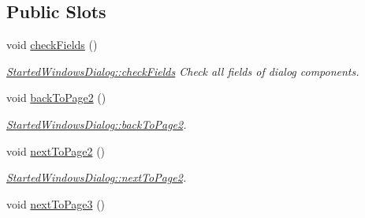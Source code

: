 \subsection*{Public Slots}
\begin{DoxyCompactItemize}
\item 
\hypertarget{classGui_1_1Dialogs_1_1StartedWindowsDialog_a9ea73c16c7917ff50c596cd1942dabfa}{void \hyperlink{classGui_1_1Dialogs_1_1StartedWindowsDialog_a9ea73c16c7917ff50c596cd1942dabfa}{check\-Fields} ()}\label{classGui_1_1Dialogs_1_1StartedWindowsDialog_a9ea73c16c7917ff50c596cd1942dabfa}

\begin{DoxyCompactList}\small\item\em \hyperlink{classGui_1_1Dialogs_1_1StartedWindowsDialog_a9ea73c16c7917ff50c596cd1942dabfa}{Started\-Windows\-Dialog\-::check\-Fields} Check all fields of dialog components. \end{DoxyCompactList}\item 
\hypertarget{classGui_1_1Dialogs_1_1StartedWindowsDialog_a690559be1b50a5ae7afc0ab64d0a28b8}{void \hyperlink{classGui_1_1Dialogs_1_1StartedWindowsDialog_a690559be1b50a5ae7afc0ab64d0a28b8}{back\-To\-Page2} ()}\label{classGui_1_1Dialogs_1_1StartedWindowsDialog_a690559be1b50a5ae7afc0ab64d0a28b8}

\begin{DoxyCompactList}\small\item\em \hyperlink{classGui_1_1Dialogs_1_1StartedWindowsDialog_a690559be1b50a5ae7afc0ab64d0a28b8}{Started\-Windows\-Dialog\-::back\-To\-Page2}. \end{DoxyCompactList}\item 
\hypertarget{classGui_1_1Dialogs_1_1StartedWindowsDialog_afd791a73e2d897147b31c829131942af}{void \hyperlink{classGui_1_1Dialogs_1_1StartedWindowsDialog_afd791a73e2d897147b31c829131942af}{next\-To\-Page2} ()}\label{classGui_1_1Dialogs_1_1StartedWindowsDialog_afd791a73e2d897147b31c829131942af}

\begin{DoxyCompactList}\small\item\em \hyperlink{classGui_1_1Dialogs_1_1StartedWindowsDialog_afd791a73e2d897147b31c829131942af}{Started\-Windows\-Dialog\-::next\-To\-Page2}. \end{DoxyCompactList}\item 
\hypertarget{classGui_1_1Dialogs_1_1StartedWindowsDialog_abac16c4f9fc0a3481565530fa01d8494}{void \hyperlink{classGui_1_1Dialogs_1_1StartedWindowsDialog_abac16c4f9fc0a3481565530fa01d8494}{next\-To\-Page3} ()}\label{classGui_1_1Dialogs_1_1StartedWindowsDialog_abac16c4f9fc0a3481565530fa01d8494}


\end{DoxyCompactItemize}
